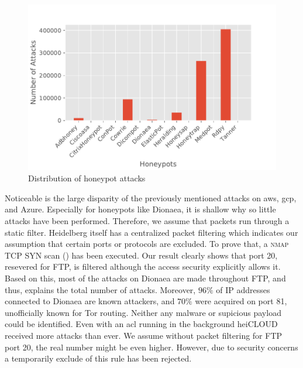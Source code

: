 \begin{figure}[ht]
    \centering
    \includegraphics[width=\textwidth]{figures/tpot-overview-attacks.pdf}
    \caption[Distribution of honeypot attacks]{Distribution of honeypot attacks}
    \label{fig:overview-attacks}
\end{figure}

Noticeable is the large disparity of the previously mentioned attacks on \ac{aws}, \ac{gcp}, and Azure.
Especially for honeypots like Dionaea, it is shallow why so little attacks have been performed.
Therefore, we assume that packets run through a static filter. 
Heidelberg itself has a centralized packet filtering which indicates our assumption that certain ports or protocols are excluded.
To prove that, a \textsc{nmap} TCP SYN scan () has been executed.
Our result clearly shows that port 20, resevered for FTP, is filtered although the access security explicitly allows it.
Based on this, most of the attacks on Dionaea are made throughout FTP, and thus, explains the total number of attacks.
Moreover, $96\%$ of IP addresses connected to Dionaea are known attackers, and $70\%$ were acquired on port 81, unofficially known for Tor routing.
Neither any malware or supicious payload could be identified.
Even with an \ac{acl} running in the background heiCLOUD received more attacks than ever.
We assume without packet filtering for FTP port 20, the real number might be even higher.
However, due to security concerns a temporarily exclude of this rule has been rejected.

